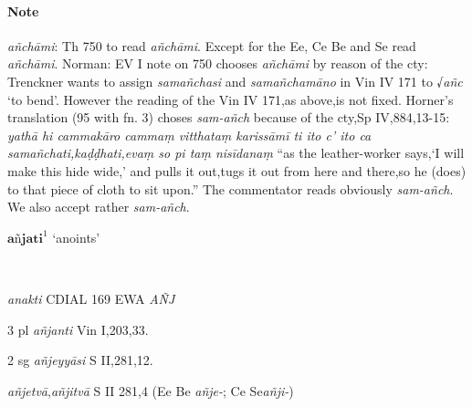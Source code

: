 \documentclass[11pt]{article}
\newcommand*\ṛ{r\symbol{"325}}
\newcommand*\Ṛ{R\symbol{"325}}
\newcommand*\ṝ{r\symbol{"304}\symbol{"325}}
\newcommand*\Ṝ{R\symbol{"304}\symbol{"325}}
\newcommand*\ḷ{l\symbol{"325}}
\newcommand*\ḹ{l\symbol{"304}\symbol{"325}}
\newcommand*\Ḷ{L\symbol{"325}}
\newcommand*\Ḹ{L\symbol{"304}\symbol{"325}}
\begin{document}
\paragraph*{Note}
\textit{añchāmi}: Th 750 to read \textit{añchāmi}.
Except for the Ee, Ce Be and Se read \textit{añchāmi}.
Norman: EV I note on 750 chooses \textit{añchāmi} by reason of the cty:
Trenckner wants to assign \textit{samañchasi} and \textit{samañchamāno} in Vin IV 171 to √\textit{añc} `to bend'.
However the reading of the Vin IV 171,as above,is not fixed.
Horner's translation (95 with fn. 3) choses \textit{sam-añch} because of the cty,Sp IV,884,13-15:
\textit{yathā hi cammakāro cammaṃ vitthataṃ karissāmī ti ito c' ito ca samañchati,kaḍḍhati,evaṃ so pi taṃ nisīdanaṃ}
``as the leather-worker says,`I will make this hide wide,' and pulls it out,tugs it out from here and there,so he (does) to that piece of cloth to sit upon.''
The commentator reads obviously \textit{sam-añch}.
We also accept rather \textit{sam-añch}.

%
%
\begin{center}
{\Large
$\textbf{añjati}^1$ `anoints'
}
\end{center}
\
\begin{description}[leftmargin=\parindent]
\item[Skt.] \textit{anakti}
CDIAL 169 EWA \textit{AÑJ}
\end{description}

\begin{description}[leftmargin=\parindent]
\item[pres.] 3 pl \textit{añjanti} Vin I,203,33.
\item[opt.] 2 sg \textit{añjeyyāsi} S II,281,12.
\item[abs.] \textit{añjetvā},\textit{añjitvā} S II 281,4 (Ee Be \textit{añje-}; Ce Se\textit{añji-})
\end{description}
\end{document}
